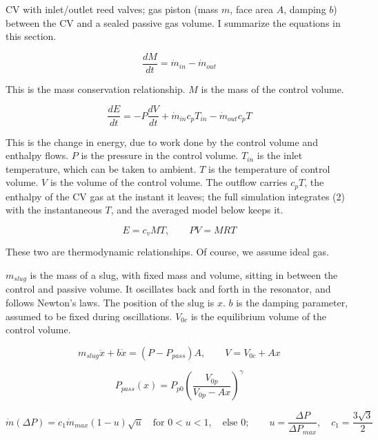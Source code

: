 \documentclass[11pt]{article}
\begin{document}
CV with inlet/outlet reed valves; gas piston (mass $m$, face area $A$, damping $b$) between the CV and a sealed passive gas volume. I summarize the equations in this section.

\begin{equation}
\frac{dM}{dt} = \dot{m}_{in} - \dot{m}_{out} \tag{1}
\end{equation}

This is the mass conservation relationship. $M$ is the mass of the control volume.

\begin{equation}
\frac{dE}{dt} = -P\frac{dV}{dt} + \dot{m}_{in}c_pT_{in} - \dot{m}_{out}c_pT \tag{2}
\end{equation}

This is the change in energy, due to work done by the control volume and enthalpy flows. $P$ is the pressure in the control volume. $T_{in}$ is the inlet temperature, which can be taken to ambient. $T$ is the temperature of control volume. $V$ is the volume of the control volume. The outflow carries $c_pT$, the enthalpy of the CV gas at the instant it leaves; the full simulation integrates (2) with the instantaneous $T$, and the averaged model below keeps it.

\begin{equation}
E = c_vMT, \qquad PV = MRT \tag{3}
\end{equation}

These two are thermodynamic relationships. Of course, we assume ideal gas.

$m_{slug}$ is the mass of a slug, with fixed mass and volume, sitting in between the control and passive volume. It oscillates back and forth in the resonator, and follows Newton's laws. The position of the slug is $x$. $b$ is the damping parameter, assumed to be fixed during oscillations. $V_{0c}$ is the equilibrium volume of the control volume.

\begin{equation}
m_{slug}\ddot x + b\dot x = (P - P_{pass})A, \qquad V = V_{0c} + Ax \tag{4}
\end{equation}

\begin{equation}
P_{pass}(x) = P_{p0}\left(\frac{V_{0p}}{V_{0p} - Ax}\right)^{\gamma} \tag{5}
\end{equation}

\begin{equation}
\dot{m}(\Delta P) = c_1\dot m_{max}(1-u)\sqrt{u} \quad \text{for } 0 < u < 1, \quad \text{else } 0; \qquad u = \frac{\Delta P}{\Delta P_{max}}, \quad c_1 = \frac{3\sqrt 3}{2} \tag{6}
\end{equation}
\end{document}
